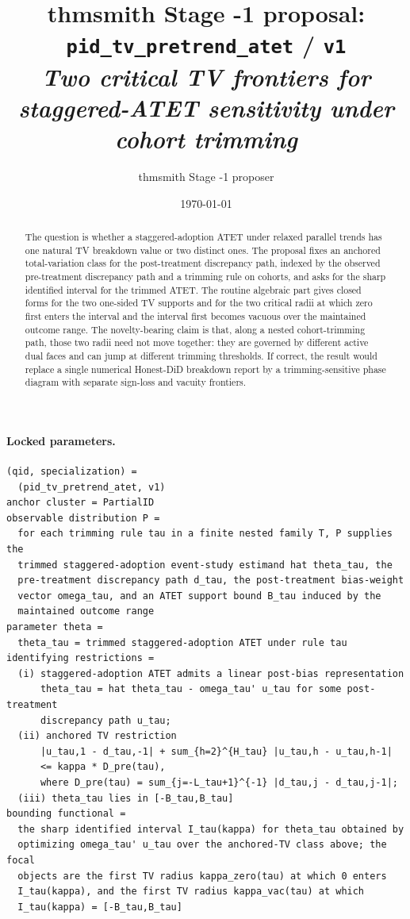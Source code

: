 \documentclass[11pt]{article}
\title{thmsmith Stage -1 proposal: \texttt{pid\_tv\_pretrend\_atet} / \texttt{v1}%
  \\ \large\textit{Two critical TV frontiers for staggered-ATET sensitivity under cohort trimming}}
\author{thmsmith Stage -1 proposer}
\date{\today}
\theoremstyle{definition}
\theoremstyle{plain}
\theoremstyle{remark}
\begin{document}
\maketitle


\paragraph{Locked parameters.}
\begin{verbatim}
(qid, specialization) =
  (pid_tv_pretrend_atet, v1)
anchor cluster = PartialID
observable distribution P =
  for each trimming rule tau in a finite nested family T, P supplies the
  trimmed staggered-adoption event-study estimand hat theta_tau, the
  pre-treatment discrepancy path d_tau, the post-treatment bias-weight
  vector omega_tau, and an ATET support bound B_tau induced by the
  maintained outcome range
parameter theta =
  theta_tau = trimmed staggered-adoption ATET under rule tau
identifying restrictions =
  (i) staggered-adoption ATET admits a linear post-bias representation
      theta_tau = hat theta_tau - omega_tau' u_tau for some post-treatment
      discrepancy path u_tau;
  (ii) anchored TV restriction
      |u_tau,1 - d_tau,-1| + sum_{h=2}^{H_tau} |u_tau,h - u_tau,h-1|
      <= kappa * D_pre(tau),
      where D_pre(tau) = sum_{j=-L_tau+1}^{-1} |d_tau,j - d_tau,j-1|;
  (iii) theta_tau lies in [-B_tau,B_tau]
bounding functional =
  the sharp identified interval I_tau(kappa) for theta_tau obtained by
  optimizing omega_tau' u_tau over the anchored-TV class above; the focal
  objects are the first TV radius kappa_zero(tau) at which 0 enters
  I_tau(kappa), and the first TV radius kappa_vac(tau) at which
  I_tau(kappa) = [-B_tau,B_tau]
\end{verbatim}

\begin{abstract}
The question is whether a staggered-adoption ATET under relaxed parallel trends has one natural TV breakdown value or two distinct ones. The proposal fixes an anchored total-variation class for the post-treatment discrepancy path, indexed by the observed pre-treatment discrepancy path and a trimming rule on cohorts, and asks for the sharp identified interval for the trimmed ATET. The routine algebraic part gives closed forms for the two one-sided TV supports and for the two critical radii at which zero first enters the interval and the interval first becomes vacuous over the maintained outcome range. The novelty-bearing claim is that, along a nested cohort-trimming path, those two radii need not move together: they are governed by different active dual faces and can jump at different trimming thresholds. If correct, the result would replace a single numerical Honest-DiD breakdown report by a trimming-sensitive phase diagram with separate sign-loss and vacuity frontiers.
\end{abstract}
\end{document}
